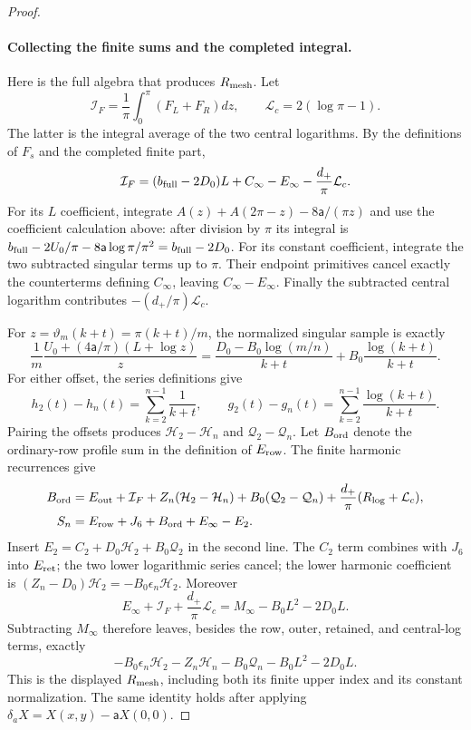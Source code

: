 \begin{proof}
\paragraph{Collecting the finite sums and the completed integral.}
Here is the full algebra that produces $R_{\rm mesh}$. Let
\[
 \mathcal I_F=\frac1\pi\int_0^\pi(F_L+F_R)dz,
 \qquad \mathcal L_c=2(\log\pi-1).
\]
The latter is the integral average of the two central logarithms.
By the definitions of $F_s$ and the completed finite part,
\[
 \mathcal I_F=(b_{\rm full}-2D_0)L+C_\infty-E_\infty
                         -\frac{d_+}{\pi}\mathcal L_c.
\]
For its $L$ coefficient, integrate
$A(z)+A(2\pi-z)-8\mathsf{a}/(\pi z)$ and use the coefficient calculation
above: after division by $\pi$ its integral is
$b_{\rm full}-2U_0/\pi-8\mathsf{a}\log\pi/\pi^2=b_{\rm full}-2D_0$.
For its constant coefficient, integrate the two subtracted singular
terms up to $\pi$. Their endpoint primitives cancel exactly the
counterterms defining $C_\infty$, leaving $C_\infty-E_\infty$.
Finally the subtracted central logarithm contributes
$-(d_+/\pi)\mathcal L_c$.

For $z=\vartheta_m(k+t)=\pi(k+t)/m$, the normalized singular sample is exactly
\[
 \frac1m\frac{U_0+(4\mathsf{a}/\pi)(L+\log z)}z
 =\frac{D_0-B_0\log(m/n)}{k+t}
       +B_0\frac{\log(k+t)}{k+t}.
\]
For either offset, the series definitions give
\[
 h_2(t)-h_n(t)=\sum_{k=2}^{n-1}\frac1{k+t},\qquad
 g_2(t)-g_n(t)=\sum_{k=2}^{n-1}\frac{\log(k+t)}{k+t}.
\]
Pairing the offsets produces $\mathcal H_2-\mathcal H_n$ and
$\mathcal Q_2-\mathcal Q_n$. Let $B_{\rm ord}$ denote the ordinary-row profile sum in the
definition of $E_{\rm row}$. The finite harmonic recurrences give
\[
 \begin{aligned}
 B_{\rm ord}
 &=E_{\rm out}+\mathcal I_F
       +Z_n(\mathcal H_2-\mathcal H_n)
       +B_0(\mathcal Q_2-\mathcal Q_n)
       +\frac{d_+}{\pi}(R_{\log}+\mathcal L_c),\\
 S_n&=E_{\rm row}+J_6+B_{\rm ord}+E_\infty-E_2.
 \end{aligned}
\]
Insert $E_2=C_2+D_0\mathcal H_2+B_0\mathcal Q_2$ in the second
line. The $C_2$ term combines with $J_6$ into $E_{\rm ret}$;
the two lower logarithmic series cancel; the lower harmonic coefficient
is $(Z_n-D_0)\mathcal H_2=-B_0\epsilon_n\mathcal H_2$.
Moreover
\[
 E_\infty+\mathcal I_F+\frac{d_+}{\pi}\mathcal L_c
 =M_\infty-B_0L^2-2D_0L.
\]
Subtracting $M_\infty$ therefore leaves, besides the row, outer,
retained, and central-log terms, exactly
\[
 -B_0\epsilon_n\mathcal H_2-Z_n\mathcal H_n-B_0\mathcal Q_n
                                      -B_0L^2-2D_0L.
\]
This is the displayed $R_{\rm mesh}$, including both its finite upper
index and its constant normalization.
The same identity holds after applying
$\delta_aX=X(x,y)-\mathsf{a}X(0,0)$.


\end{proof}
